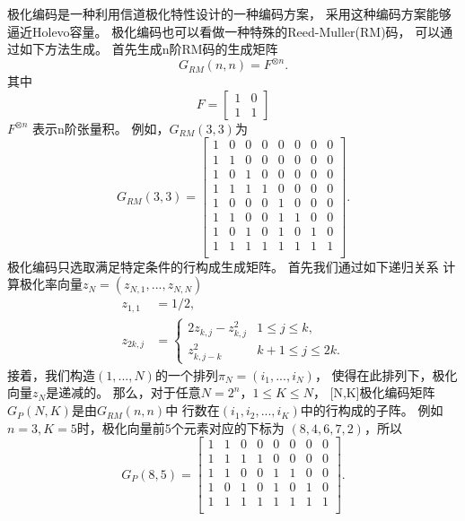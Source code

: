 极化编码是一种利用信道极化特性设计的一种编码方案\cite{arikan2009channel,korada2009polar,wilde2013polar}，
采用这种编码方案能够逼近Holevo容量\cite{guha2012polar}。
极化编码也可以看做一种特殊的Reed-Muller(RM)码，
可以通过如下方法生成\cite{arikan2008performance}。
首先生成n阶RM码的生成矩阵
\begin{equation}
G_{RM}(n, n) = F^{\otimes n}.
\end{equation}
其中
\begin{equation}
F = \begin{bmatrix}
        1 & 0 \\
        1 & 1  
    \end{bmatrix}
\end{equation}
$F^{\otimes n}$ 表示n阶张量积。
例如，$G_{RM}(3,3)$为
\begin{equation}
G_{RM}(3,3) = \left[
\begin{array}{cccccccc}
 1 & 0 & 0 & 0 & 0 & 0 & 0 & 0 \\
 1 & 1 & 0 & 0 & 0 & 0 & 0 & 0 \\
 1 & 0 & 1 & 0 & 0 & 0 & 0 & 0 \\
 1 & 1 & 1 & 1 & 0 & 0 & 0 & 0 \\
 1 & 0 & 0 & 0 & 1 & 0 & 0 & 0 \\
 1 & 1 & 0 & 0 & 1 & 1 & 0 & 0 \\
 1 & 0 & 1 & 0 & 1 & 0 & 1 & 0 \\
 1 & 1 & 1 & 1 & 1 & 1 & 1 & 1 \\
\end{array}
\right].
\end{equation}
极化编码只选取满足特定条件的行构成生成矩阵。
首先我们通过如下递归关系
计算极化率向量$z_N = (z_{N,1}, ..., z_{N,N})$
\begin{equation}
\begin{split}
z_{1,1} &= 1/2, \\
z_{2k, j} &= \begin{cases}
                2 z_{k,j} - z_{k,j}^2 & 1 \le j \le k, \\
                z_{k,j-k}^2           & k+1 \le j \le 2k .
            \end{cases}
\end{split}
\end{equation}
接着，我们构造$(1,...,N)$的一个排列$\pi_N = (i_1, ..., i_N)$，
使得在此排列下，极化向量$z_N$是递减的。
那么，对于任意$N=2^n$，$1 \le K \le N$，
[N,K]极化编码矩阵$G_P(N,K)$是由$G_{RM}(n,n)$中
行数在$(i_1,i_2,...,i_K)$中的行构成的子阵。
例如$n=3,K=5$时，极化向量前5个元素对应的下标为
$(8, 4, 6, 7, 2)$，所以
\begin{equation}
G_{P}(8,5) = \left[
\begin{array}{cccccccc}
 1 & 1 & 0 & 0 & 0 & 0 & 0 & 0 \\
 1 & 1 & 1 & 1 & 0 & 0 & 0 & 0 \\
 1 & 1 & 0 & 0 & 1 & 1 & 0 & 0 \\
 1 & 0 & 1 & 0 & 1 & 0 & 1 & 0 \\
 1 & 1 & 1 & 1 & 1 & 1 & 1 & 1 \\
\end{array}
\right].
\end{equation}


